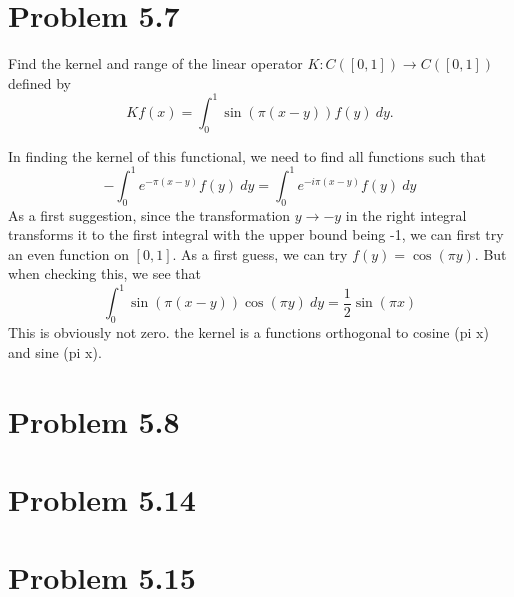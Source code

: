 \newpage
\section{Problem 5.7}
Find the kernel and range of the linear operator $K: C([0, 1]) \rightarrow C([0, 1])$ defined by 
\[ Kf(x) = \int_0^1 \sin\left( \pi (x - y)\right)f(y) \ dy.\]
\partbreak
\begin{solution}

    In finding the kernel of this functional, we need to find all functions such that
    \[-\int_0^1 e^{-\pi(x - y)} f(y) \ dy = \int_0^1 e^{-i\pi(x - y)}f(y) \ dy\]
    As a first suggestion, since the transformation $y \rightarrow -y$ in the right integral transforms it to the first integral with the upper bound being -1, we can first try an even function on $[0, 1]$. As a first guess, we can try $f(y) = \cos(\pi y)$. But when checking this, we see that 
    \[\int_0^1 \sin \left( \pi(x - y)\right)\cos(\pi y) \ dy = \frac{1}{2}\sin(\pi x)\]
    This is obviously not zero. the kernel is a functions orthogonal to cosine (pi x) and sine (pi x).
\end{solution}

\newpage
\section{Problem 5.8}

\newpage
\section{Problem 5.14}

\newpage
\section{Problem 5.15}

